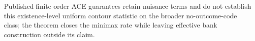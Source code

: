 Published finite-order ACE guarantees retain nuisance terms and do not establish this existence-level uniform contour statistic on the broader no-outcome-code class; the theorem closes the minimax rate while leaving effective bank construction outside its claim.